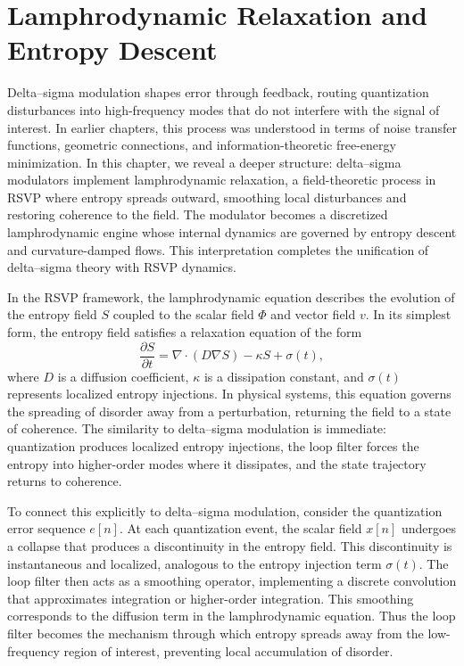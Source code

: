
\chapter{Lamphrodynamic Relaxation and Entropy Descent}

Delta–sigma modulation shapes error through feedback, routing quantization disturbances into high-frequency modes that do not interfere with the signal of interest. In earlier chapters, this process was understood in terms of noise transfer functions, geometric connections, and information-theoretic free-energy minimization. In this chapter, we reveal a deeper structure: delta–sigma modulators implement lamphrodynamic relaxation, a field-theoretic process in RSVP where entropy spreads outward, smoothing local disturbances and restoring coherence to the field. The modulator becomes a discretized lamphrodynamic engine whose internal dynamics are governed by entropy descent and curvature-damped flows. This interpretation completes the unification of delta–sigma theory with RSVP dynamics.

In the RSVP framework, the lamphrodynamic equation describes the evolution of the entropy field \(S\) coupled to the scalar field \(\Phi\) and vector field \(v\). In its simplest form, the entropy field satisfies a relaxation equation of the form
\[
\frac{\partial S}{\partial t} = \nabla \cdot ( D \nabla S ) - \kappa S + \sigma(t),
\]
where \(D\) is a diffusion coefficient, \(\kappa\) is a dissipation constant, and \(\sigma(t)\) represents localized entropy injections. In physical systems, this equation governs the spreading of disorder away from a perturbation, returning the field to a state of coherence. The similarity to delta–sigma modulation is immediate: quantization produces localized entropy injections, the loop filter forces the entropy into higher-order modes where it dissipates, and the state trajectory returns to coherence.

To connect this explicitly to delta–sigma modulation, consider the quantization error sequence \(e[n]\). At each quantization event, the scalar field \(x[n]\) undergoes a collapse that produces a discontinuity in the entropy field. This discontinuity is instantaneous and localized, analogous to the entropy injection term \(\sigma(t)\). The loop filter then acts as a smoothing operator, implementing a discrete convolution that approximates integration or higher-order integration. This smoothing corresponds to the diffusion term in the lamphrodynamic equation. Thus the loop filter becomes the mechanism through which entropy spreads away from the low-frequency region of interest, preventing local accumulation of disorder.

